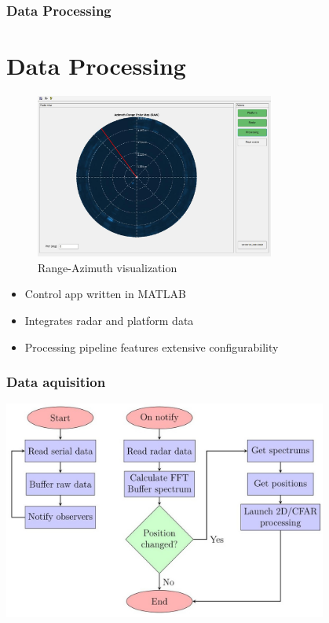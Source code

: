 \documentclass[aspectratio=43]{beamer}
\begin{document}
\begin{frame}[fragile]
  \frametitle{Data Processing}
  \section{Data Processing}

  \begin{figure}[h!]
    \centering
    \includegraphics[width=0.7\textwidth]{../img/vis_range_azimuth.jpg}
    \caption[]{Range-Azimuth visualization}
  \end{figure}

  \begin{itemize}
    \item Control app written in MATLAB
    \item Integrates radar and platform data
    \item Processing pipeline features extensive configurability
  \end{itemize}
\end{frame}

\begin{frame}[fragile]
  \frametitle{Data aquisition}
  \begin{center}
    \includegraphics[width=0.8\textwidth]{../img/dataflow_1.jpg}
  \end{center}
\end{frame}
\end{document}
